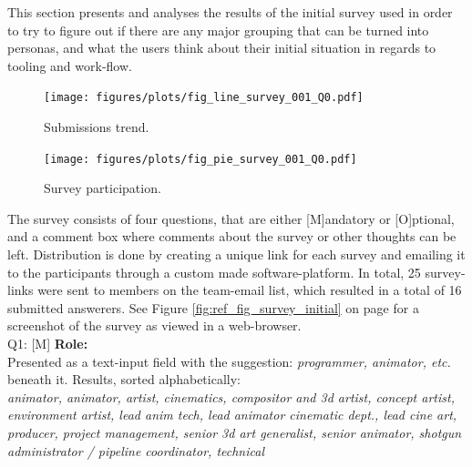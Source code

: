   This section presents and analyses the results of the initial survey used in
  order to try to figure out if there are any major grouping that can be turned
  into personas, and what the users think about their initial situation in
  regards to tooling and work-flow.

  \hspace{0.8cm}
  \begin{minipage}[b]{0.44\textwidth}
    \begin{figure}[H]
      \centering
        \texttt{[image: figures/plots/fig\_line\_survey\_001\_Q0.pdf]}
        \caption{Submissions trend.}
      \end{figure}
  \end{minipage}
  \begin{minipage}[b]{0.49\textwidth}
    \begin{figure}[H]
      \texttt{[image: figures/plots/fig\_pie\_survey\_001\_Q0.pdf]}
      \caption{Survey participation.}
    \end{figure}
  \end{minipage}


  \vspace{0.2cm}
  The survey consists of four questions, that are either [M]andatory or
  [O]ptional, and a comment box where comments about the survey or other
  thoughts can be left. Distribution is done by creating a unique link for each
  survey and emailing it to the participants through a custom made software-platform. In
  total, 25 survey-links were sent to members on the team-email list, which
  resulted in a total of 16
  submitted answerers. See Figure \ref{fig:ref_fig_survey_initial} on page
  \pageref{fig:ref_fig_survey_initial} for a screenshot of
  the survey as viewed in a web-browser.\\

  Q1: [M] \textbf{Role:} \\ Presented as a text-input field with the suggestion: \textit{programmer,
    animator, etc.} beneath it. Results, sorted alphabetically:  \\
  \textit{
    animator, animator, artist, cinematics, compositor and 3d artist, concept
    artist, environment artist, lead anim tech, lead animator cinematic dept., lead
    cine art, producer, project management, senior 3d art generalist, senior
    animator, shotgun administrator / pipeline coordinator, technical
  } \\

